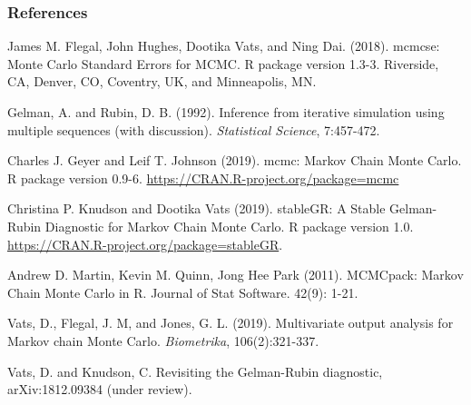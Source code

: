 \documentclass{beamer}
\begin{document}
\begin{frame}
\frametitle{References}
\small  

James M. Flegal, John Hughes, Dootika Vats, and Ning Dai. (2018). mcmcse: Monte
  Carlo Standard Errors for MCMC. R package version 1.3-3. Riverside, CA, Denver,
  CO, Coventry, UK, and Minneapolis, MN. \\

\vspace{.15cm}


Gelman, A. and Rubin, D. B. (1992). Inference from iterative simulation using multiple sequences (with discussion). \textit{Statistical Science}, 7:457-472.\\

\vspace{.15cm}

Charles J. Geyer and Leif T. Johnson (2019). mcmc: Markov Chain Monte Carlo. R
  package version 0.9-6. \url{https://CRAN.R-project.org/package=mcmc} \\

\vspace{.15cm}

Christina P. Knudson and Dootika Vats (2019). stableGR: A Stable Gelman-Rubin Diagnostic
  for Markov Chain Monte Carlo. R package version 1.0.
\url{  https://CRAN.R-project.org/package=stableGR}. \\



\vspace{.15cm}

Andrew D. Martin, Kevin M. Quinn, Jong Hee Park (2011). MCMCpack: Markov Chain
  Monte Carlo in R. Journal of Stat Software. 42(9): 1-21. \\

\vspace{.15cm}

Vats, D., Flegal, J. M, and Jones, G. L. (2019). Multivariate output analysis for Markov chain Monte Carlo. \textit{Biometrika},  106(2):321-337. \\

\vspace{.15cm}

Vats, D. and Knudson, C. Revisiting the Gelman-Rubin diagnostic, arXiv:1812.09384 (under review).


\end{frame}
\end{document}
